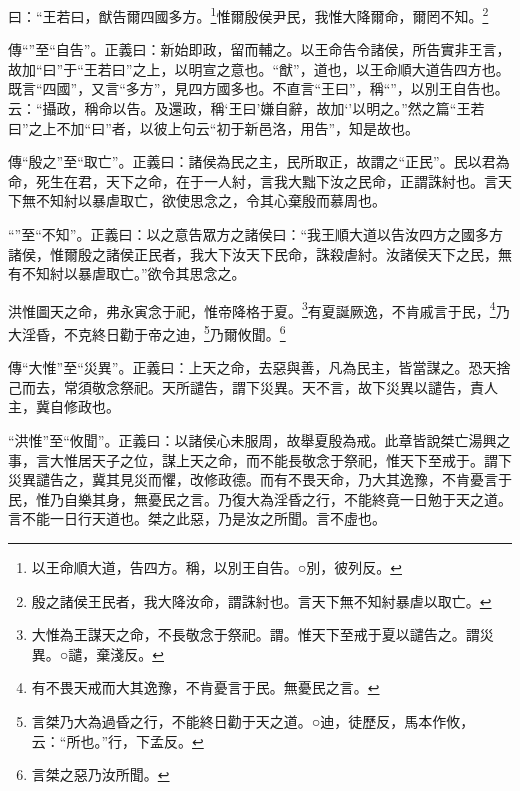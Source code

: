 曰：“王若曰，猷告爾四國多方。\footnote{以王命順大道，告四方。稱，以別王自告。○別，彼列反。}惟爾殷侯尹民，我惟大降爾命，爾罔不知。\footnote{殷之諸侯王民者，我大降汝命，謂誅紂也。言天下無不知紂暴虐以取亡。}


{\noindent\zhuan{}\fzbyks 傳“”至“自告”。正義曰：新始即政，留而輔之。以王命告令諸侯，所告實非王言，故加“曰”于“王若曰”之上，以明宣之意也。“猷”，道也，以王命順大道告四方也。既言“四國”，又言“多方”，見四方國多也。不直言“王曰”，稱“”，以別王自告也。云：“攝政，稱命以告。及還政，稱‘王曰’嫌自辭，故加‘’以明之。”然之篇“王若曰”之上不加“曰”者，以彼上句云“初于新邑洛，用告”，知是故也。 \par}

{\noindent\zhuan{}\fzbyks 傳“殷之”至“取亡”。正義曰：諸侯為民之主，民所取正，故謂之“正民”。民以君為命，死生在君，天下之命，在于一人紂，言我大黜下汝之民命，正謂誅紂也。言天下無不知紂以暴虐取亡，欲使思念之，令其心棄殷而慕周也。 \par}

{\noindent\shu{}\fzkt “”至“不知”。正義曰：以之意告眾方之諸侯曰：“我王順大道以告汝四方之國多方諸侯，惟爾殷之諸侯正民者，我大下汝天下民命，誅殺虐紂。汝諸侯天下之民，無有不知紂以暴虐取亡。”欲令其思念之。 \par}

洪惟圖天之命，弗永寅念于祀，惟帝降格于夏。\footnote{大惟為王謀天之命，不長敬念于祭祀。謂。惟天下至戒于夏以譴告之。謂災異。○譴，棄淺反。}有夏誕厥逸，不肯戚言于民，\footnote{有不畏天戒而大其逸豫，不肯憂言于民。無憂民之言。}乃大淫昏，不克終日勸于帝之迪，\footnote{言桀乃大為過昏之行，不能終日勸于天之道。○迪，徒歷反，馬本作攸，云：“所也。”行，下孟反。}乃爾攸聞。\footnote{言桀之惡乃汝所聞。}


{\noindent\zhuan{}\fzbyks 傳“大惟”至“災異”。正義曰：上天之命，去惡與善，凡為民主，皆當謀之。恐天捨己而去，常須敬念祭祀。天所譴告，謂下災異。天不言，故下災異以譴告，責人主，冀自修政也。 \par}

{\noindent\shu{}\fzkt “洪惟”至“攸聞”。正義曰：以諸侯心未服周，故舉夏殷為戒。此章皆說桀亡湯興之事，言大惟居天子之位，謀上天之命，而不能長敬念于祭祀，惟天下至戒于。謂下災異譴告之，冀其見災而懼，改修政德。而有不畏天命，乃大其逸豫，不肯憂言于民，惟乃自樂其身，無憂民之言。乃復大為淫昏之行，不能終竟一日勉于天之道。言不能一日行天道也。桀之此惡，乃是汝之所聞。言不虛也。 \par}

